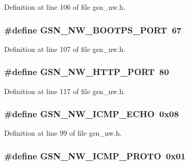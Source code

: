 Definition at line 106 of file gsn\_\-nw.h.

\hypertarget{a00532_ab42745a3d96ab5a190e78201bcdcf6f3}{
\subsubsection[{GSN\_\-NW\_\-BOOTPS\_\-PORT}]{\setlength{\rightskip}{0pt plus 5cm}\#define GSN\_\-NW\_\-BOOTPS\_\-PORT~67}}
\label{a00532_ab42745a3d96ab5a190e78201bcdcf6f3}


Definition at line 107 of file gsn\_\-nw.h.

\hypertarget{a00532_a19fbfe0b325520621e45e19eb9aa9111}{
\subsubsection[{GSN\_\-NW\_\-HTTP\_\-PORT}]{\setlength{\rightskip}{0pt plus 5cm}\#define GSN\_\-NW\_\-HTTP\_\-PORT~80}}
\label{a00532_a19fbfe0b325520621e45e19eb9aa9111}


Definition at line 117 of file gsn\_\-nw.h.

\hypertarget{a00532_a9e1d162e9273038a81a8df526cdad4f6}{
\subsubsection[{GSN\_\-NW\_\-ICMP\_\-ECHO}]{\setlength{\rightskip}{0pt plus 5cm}\#define GSN\_\-NW\_\-ICMP\_\-ECHO~0x08}}
\label{a00532_a9e1d162e9273038a81a8df526cdad4f6}


Definition at line 99 of file gsn\_\-nw.h.

\hypertarget{a00532_ae53b9a1d86963af5d24f245c8895ef39}{
\subsubsection[{GSN\_\-NW\_\-ICMP\_\-PROTO}]{\setlength{\rightskip}{0pt plus 5cm}\#define GSN\_\-NW\_\-ICMP\_\-PROTO~0x01}}
\label{a00532_ae53b9a1d86963af5d24f245c8895ef39}


